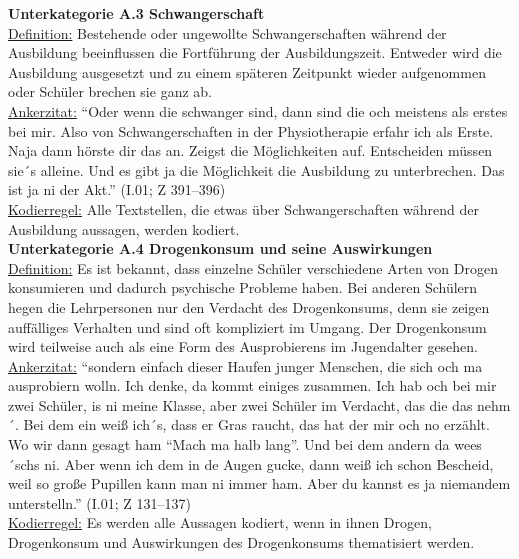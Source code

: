 \textbf{Unterkategorie A.3 Schwangerschaft}\\
\underline{Definition:} Bestehende oder ungewollte Schwangerschaften während der Ausbildung beeinflussen die Fortführung der Ausbildungszeit. Entweder wird die Ausbildung ausgesetzt und zu einem späteren Zeitpunkt wieder aufgenommen oder Schüler brechen sie ganz ab.\\
\underline{Ankerzitat:} "`Oder wenn die schwanger sind, dann sind die och meistens als erstes bei mir. Also von Schwangerschaften in der Physiotherapie erfahr ich als Erste. Naja dann hörste dir das an. Zeigst die Möglichkeiten auf. Entscheiden müssen sie´s alleine. Und es gibt ja die Möglichkeit die Ausbildung zu unterbrechen. Das ist ja ni der Akt."' (I.01; Z 391--396)\\
\underline{Kodierregel:} Alle Textstellen, die etwas über Schwangerschaften während der Ausbildung aussagen, werden kodiert.\\

\textbf{Unterkategorie A.4 Drogenkonsum und seine Auswirkungen}\\
\underline{Definition:} Es ist bekannt, dass einzelne Schüler verschiedene Arten von Drogen konsumieren und dadurch psychische Probleme haben. Bei anderen Schülern hegen die Lehrpersonen nur den Verdacht des Drogenkonsums, denn sie zeigen auffälliges Verhalten und sind oft kompliziert im Umgang. Der Drogenkonsum wird teilweise auch als eine Form des Ausprobierens im Jugendalter gesehen.\\
\underline{Ankerzitat:} "`sondern einfach dieser Haufen junger Menschen, die sich och ma ausprobiern wolln. Ich denke, da kommt einiges zusammen. Ich hab och bei mir zwei Schüler, is ni meine Klasse, aber zwei Schüler im Verdacht, das die das nehm´. Bei dem ein weiß ich´s, dass er Gras raucht, das hat der mir och no erzählt. Wo wir dann gesagt ham "`Mach ma halb lang"'. Und bei dem andern da wees´schs ni. Aber wenn ich dem in de Augen gucke, dann weiß ich schon Bescheid, weil so große Pupillen kann man ni immer ham. Aber du kannst es ja niemandem unterstelln."' (I.01; Z 131--137)\\
\underline{Kodierregel:} Es werden alle Aussagen kodiert, wenn in ihnen Drogen, Drogenkonsum und Auswirkungen des Drogenkonsums thematisiert werden.\\

